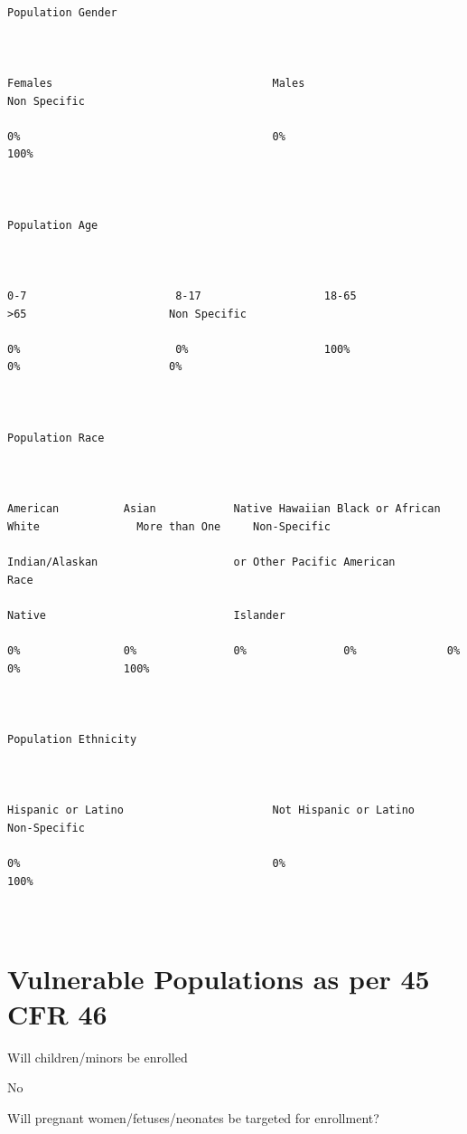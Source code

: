 \documentclass[10pt, letterpaper]{article}
\begin{document}
{\footnotesize

\begin{verbatim}

Population Gender



Females                                  Males                                    Non Specific

0%                                       0%                                       100%



Population Age



0-7                       8-17                   18-65                    >65                      Non Specific

0%                        0%                     100%                     0%                       0%



Population Race



American          Asian            Native Hawaiian Black or African White               More than One     Non-Specific

Indian/Alaskan                     or Other Pacific American                            Race

Native                             Islander

0%                0%               0%               0%              0%                  0%                100%



Population Ethnicity



Hispanic or Latino                       Not Hispanic or Latino                   Non-Specific

0%                                       0%                                       100%



\end{verbatim}

}

\section*{Vulnerable Populations as per 45 CFR 46}

Will children/minors be enrolled

No

Will pregnant women/fetuses/neonates be targeted for enrollment?
\end{document}
